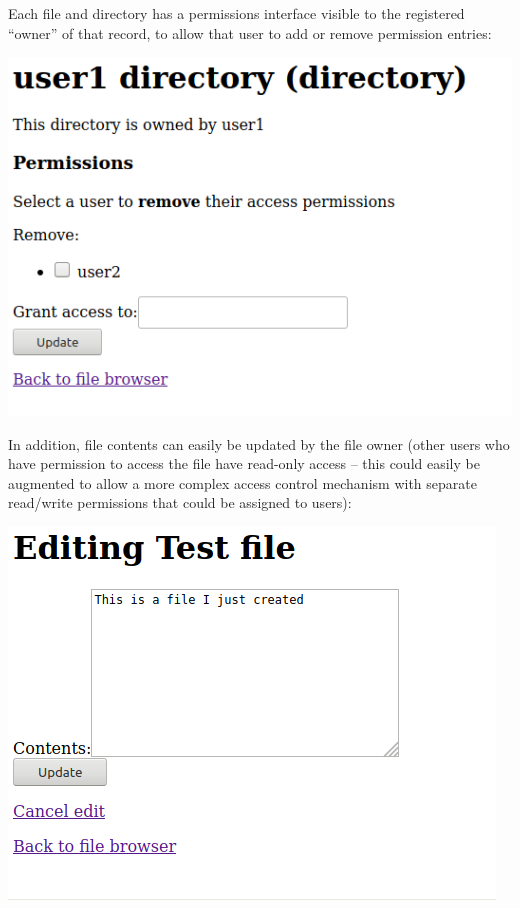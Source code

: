 \documentclass[12pt]{report}
\begin{document}
Each file and directory has a permissions interface visible to the registered ``owner'' of that record, to allow that user to add or remove permission entries:

\begin{center}
  \includegraphics[scale=0.5]{06-browser2-perms.png}
\end{center}

In addition, file contents can easily be updated by the file owner (other users who have permission to access the file have read-only access -- this could easily be augmented to allow a more complex access control mechanism with separate read/write permissions that could be assigned to users):

\begin{center}
  \includegraphics[scale=0.5]{07-browser3-file-contents.png}
\end{center}
\end{document}
